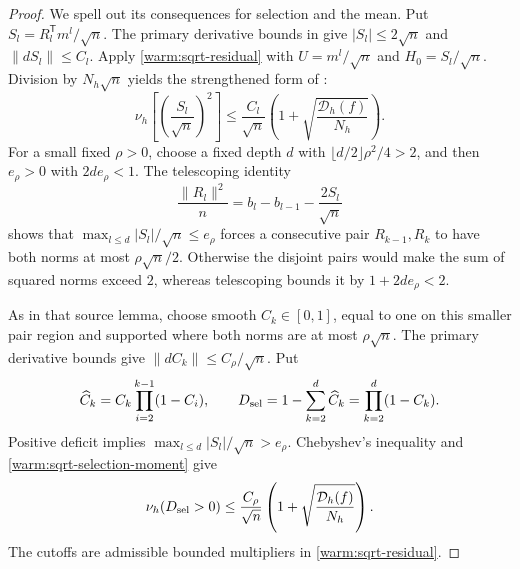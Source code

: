 \begin{proof}
We spell out its consequences for selection and the mean.  Put
\(S_l=R_l^{\mathsf T}m^l/\sqrt n\).
The primary derivative bounds in \cite[Lemma~7.1]{SG} give
\(|S_l|\le2\sqrt n\) and \(\|dS_l\|\le C_l\).  Apply
\eqref{warm:sqrt-residual} with \(U=m^l/\sqrt n\) and
\(H_0=S_l/\sqrt n\).  Division by \(N_h\sqrt n\) yields the
strengthened form of \cite[Equation~(7.1)]{SG}:
\begin{equation}
 \nu_h\!\left[\left(\frac{S_l}{\sqrt n}\right)^2\right]
 \le\frac{C_l}{\sqrt n}
       \left(1+\sqrt{\frac{\mathcal D_h(f)}{N_h}}\right).
                                                               \label{warm:sqrt-selection-moment}
\end{equation}
For a small fixed \(\rho>0\), choose a fixed depth \(d\) with
\(\lfloor d/2\rfloor\rho^2/4>2\), and then \(e_\rho>0\) with
\(2de_\rho<1\).  The telescoping identity
\[
 \frac{\|R_l\|^2}{n}=b_l-b_{l-1}-\frac{2S_l}{\sqrt n}
\]
shows that \(\max_{l\le d}|S_l|/\sqrt n\le e_\rho\) forces a
consecutive pair \(R_{k-1},R_k\) to have both norms at most
\(\rho\sqrt n/2\).  Otherwise the disjoint pairs would make the sum
of squared norms exceed \(2\), whereas telescoping bounds it by
\(1+2de_\rho<2\).

As in that source lemma, choose smooth \(C_k\in[0,1]\), equal to one
on this smaller pair region and supported where both norms are at
most \(\rho\sqrt n\).  The primary derivative bounds give
\(\|dC_k\|\le C_\rho/\sqrt n\).  Put
\[
 \widehat C_k=C_k\prod_{i=2}^{k-1}(1-C_i),\qquad
 D_{\rm sel}=1-\sum_{k=2}^d\widehat C_k=\prod_{k=2}^d(1-C_k).
\]
Positive deficit implies \(\max_{l\le d}|S_l|/\sqrt n>e_\rho\).
Chebyshev's inequality and \eqref{warm:sqrt-selection-moment} give
\begin{equation}
 \nu_h(D_{\rm sel}>0)
 \le\frac{C_\rho}{\sqrt n}
       \left(1+\sqrt{\frac{\mathcal D_h(f)}{N_h}}\right).
                                                               \label{warm:sqrt-deficit}
\end{equation}
The cutoffs are admissible bounded multipliers in
\eqref{warm:sqrt-residual}.


\end{proof}
